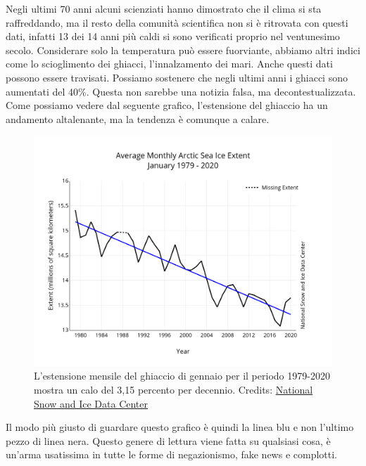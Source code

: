 \documentclass[12pt]{book} %
\begin{document}
Negli ultimi 70 anni alcuni scienziati hanno dimostrato che il clima si sta raffreddando, ma il resto della comunità
scientifica non si è ritrovata con questi dati, infatti 13 dei 14 anni più caldi si sono verificati proprio nel
ventunesimo secolo. Considerare solo la temperatura può essere fuorviante, abbiamo altri indici come lo scioglimento
dei ghiacci, l'innalzamento dei mari. Anche questi dati possono essere travisati. Possiamo sostenere che negli ultimi anni i ghiacci sono aumentati del 40\%. Questa non sarebbe una notizia falsa, ma decontestualizzata. Come possiamo vedere dal seguente grafico, l'estensione del ghiaccio ha un andamento altalenante, ma la tendenza è comunque a calare.

\needspace{4cm}
\begin{figure}[H]
  \centering
  \includegraphics[width=0.95\linewidth]{images/Libro-img021.png}
  \caption{L'estensione mensile del ghiaccio di gennaio per il
periodo 1979-2020 mostra un calo del 3,15 percento per decennio. Credits: \href{https://nsidc.org/arcticseaicenews/2020/02/}{National Snow and Ice Data Center}}
\end{figure}

Il modo più giusto di guardare questo grafico è quindi la linea blu e non l'ultimo pezzo di linea
nera. Questo genere di lettura viene fatta su qualsiasi cosa, è un'arma usatissima in tutte le
forme di negazionismo, fake news e complotti.
\end{document}
